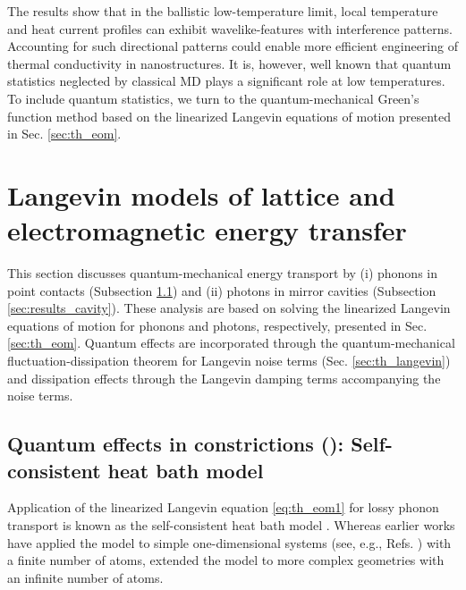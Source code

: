 The results show that in the ballistic low-temperature limit, local temperature and heat current profiles can exhibit wavelike-features with interference patterns. Accounting for such directional patterns could enable more efficient engineering of thermal conductivity in nanostructures. It is, however, well known that quantum statistics neglected by classical MD plays a significant role at low temperatures. To include quantum statistics, we turn to the quantum-mechanical Green's function method based on the linearized Langevin equations of motion presented in Sec. \ref{sec:th_eom}.

\section{Langevin models of lattice and electromagnetic energy transfer}
\label{sec:results_gf}

This section discusses quantum-mechanical energy transport by (i) phonons in point contacts (Subsection \ref{sec:results_schb}) and (ii) photons in mirror cavities (Subsection \ref{sec:results_cavity}). These analysis are based on solving the linearized Langevin equations of motion for phonons and photons, respectively, presented in Sec. \ref{sec:th_eom}. Quantum effects are incorporated through the quantum-mechanical fluctuation-dissipation theorem for Langevin noise terms (Sec. \ref{sec:th_langevin}) and dissipation effects through the Langevin damping terms accompanying the noise terms. %

\subsection{Quantum effects in constrictions (): Self-consistent heat bath model}
\label{sec:results_schb}

Application of the linearized Langevin equation \eqref{eq:th_eom1} for lossy phonon transport is known as the self-consistent heat bath model \cite{bolsterli70}. Whereas earlier works have applied the model to simple one-dimensional systems (see, e.g., Refs. \cite{bolsterli70,visscher75,dhar03,dhar06,segal09,bandyopadhyay11}) with a finite number of atoms,  extended the model to more complex geometries with an infinite number of atoms.  %

